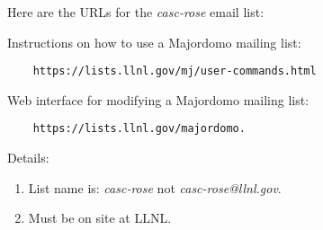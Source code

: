 Here are the URLs for the {\em casc-rose} email list:

Instructions on how to use a Majordomo mailing list: \\
\begin{verbatim}
    https://lists.llnl.gov/mj/user-commands.html
\end{verbatim}

Web interface for modifying a Majordomo mailing list: \\
\begin{verbatim}
    https://lists.llnl.gov/majordomo.
\end{verbatim}

Details: \\
\begin{enumerate}
   \item List name is: {\em casc-rose} not {\em casc-rose@llnl.gov}.
   \item Must be on site at LLNL.
\end{enumerate}



